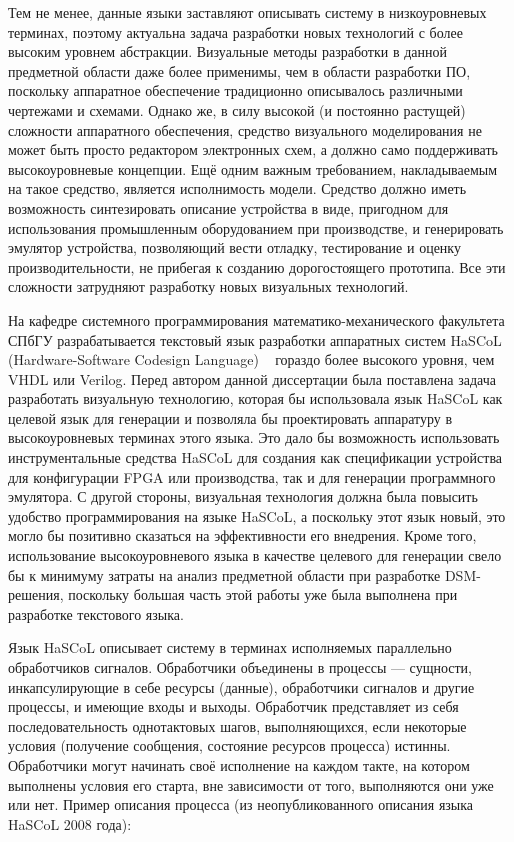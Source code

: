 Тем не менее, данные языки заставляют описывать систему в низкоуровневых терминах, 
поэтому актуальна задача разработки новых технологий с более высоким уровнем абстракции. 
Визуальные методы разработки в данной предметной области даже более применимы, чем 
в области разработки ПО, поскольку аппаратное обеспечение традиционно описывалось 
различными чертежами и схемами. Однако же, в силу высокой (и постоянно растущей) сложности 
аппаратного обеспечения, средство визуального моделирования не может быть просто редактором 
электронных схем, а должно само поддерживать высокоуровневые концепции. Ещё одним 
важным требованием, накладываемым на такое средство, является исполнимость модели. 
Средство должно иметь возможность синтезировать описание устройства в виде, пригодном 
для использования промышленным оборудованием при производстве, и генерировать эмулятор 
устройства, позволяющий вести отладку, тестирование и оценку производительности, не 
прибегая к созданию дорогостоящего прототипа. Все эти сложности затрудняют разработку 
новых визуальных технологий.

На кафедре системного программирования математико-механического факультета СПбГУ разрабатывается 
текстовый язык разработки аппаратных систем HaSCoL (Hardware-Software Codesign Language)%
~\cite{boulytchev2010hardware} гораздо более высокого уровня, чем VHDL или Verilog. Перед автором данной диссертации 
была поставлена задача разработать визуальную технологию, которая бы использовала 
язык HaSCoL как целевой язык для генерации и позволяла бы проектировать аппаратуру 
в высокоуровневых терминах этого языка. Это дало бы возможность использовать инструментальные 
средства HaSCoL для создания как спецификации устройства для конфигурации \ac{FPGA}
или производства, так и для генерации программного эмулятора. С другой стороны, визуальная 
технология должна была повысить удобство программирования на языке HaSCoL, а поскольку 
этот язык новый, это могло бы позитивно сказаться на эффективности его внедрения. 
Кроме того, использование высокоуровневого языка в качестве целевого для генерации 
свело бы к минимуму затраты на анализ предметной области при разработке DSM-решения, 
поскольку большая часть этой работы уже была выполнена при разработке текстового языка.

Язык HaSCoL описывает систему  в терминах исполняемых параллельно обработчиков сигналов.
Обработчики объединены в процессы --- сущности, инкапсулирующие в себе ресурсы (данные), 
обработчики сигналов и другие процессы, и имеющие входы и выходы. Обработчик представляет 
из себя последовательность однотактовых шагов, выполняющихся, если некоторые условия 
(получение сообщения, состояние ресурсов процесса) истинны. Обработчики могут начинать 
своё исполнение на каждом такте, на котором выполнены условия его старта, вне зависимости 
от того, выполняются они уже или нет. Пример описания процесса (из неопубликованного
описания языка HaSCoL 2008 года):

